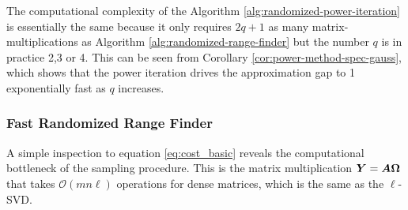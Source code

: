 \begin{figure}[ht]
\begin{center}
\end{center}
\end{figure}

The computational complexity of the Algorithm \ref{alg:randomized-power-iteration}
is essentially the same because
it only requires $2q+1$ as many matrix-multiplications as Algorithm
\ref{alg:randomized-range-finder}
but the number $q$ is in practice 2,3 or 4. This can be seen from 
Corollary \ref{cor:power-method-spec-gauss},
which shows that the power iteration drives the approximation
gap to 1 exponentially fast as $q$ increases.



\subsubsection{Fast Randomized Range Finder}
\label{alg:fast-randomized-range-finder}

A simple inspection to equation \ref{eq:cost_basic} reveals the computational
bottleneck of the sampling procedure. This is the matrix multiplication
$\bm{Y}=\bm{A}\bm{\Omega}$ that takes $\mathcal{O}(mn\ell)$ operations
for dense matrices, which is the same as the $\ell$-SVD.

